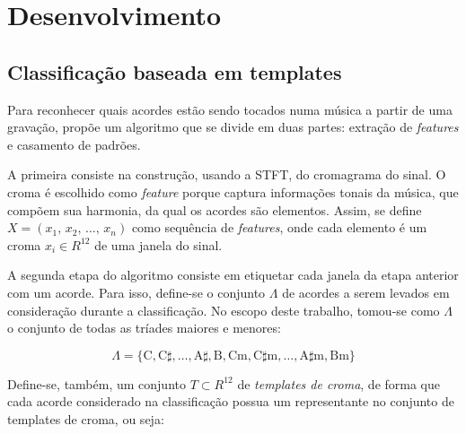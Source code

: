 \chapter{Desenvolvimento}
\label{cap:desenvolvimento}

\section{Classificação baseada em templates}
\label{sec:classifier}
    
    Para reconhecer quais acordes estão sendo tocados numa música a partir de uma gravação, \cite{muller} propõe um algoritmo que se divide em duas partes: extração de \textit{features} e casamento de padrões.
    
    A primeira consiste na construção, usando a STFT, do cromagrama do sinal. O croma é escolhido como \textit{feature} porque captura informações tonais da música, que compõem sua harmonia, da qual os acordes são elementos. Assim, se define $X = (x_1\textrm{, }x_2\textrm{, }\dots\textrm{, }x_n)$ como sequência de \textit{features}, onde cada elemento é um croma $x_i \in R^{12}$ de uma janela do sinal.
    
    A segunda etapa do algoritmo consiste em etiquetar cada janela da etapa anterior com um acorde. Para isso, define-se o conjunto $\Lambda$ de acordes a serem levados em consideração durante a classificação. No escopo deste trabalho, tomou-se como $\Lambda$ o conjunto de todas as tríades maiores e menores:
    
    \begin{equation}\label{Lambda}
        \Lambda = \{
            \textrm{C},
            \textrm{C}\sharp,
            \dots,
            \textrm{A}\sharp,
            \textrm{B},
            \textrm{Cm},
            \textrm{C}\sharp\textrm{m},
            \dots,
            \textrm{A}\sharp\textrm{m},
            \textrm{Bm}
        \}
    \end{equation}
    
    Define-se, também, um conjunto $T \subset R^{12}$ de \textit{templates de croma}, de forma que cada acorde considerado na classificação possua um representante no conjunto de templates de croma, ou seja:
    
